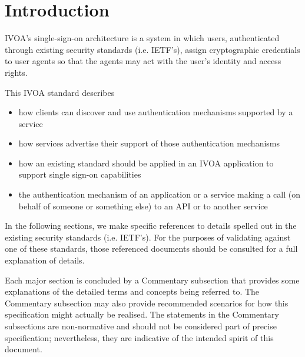 \documentclass[11pt,a4paper]{ivoa}
\begin{document}
\section{Introduction}

IVOA's single-sign-on architecture is a system in which users,
authenticated through existing security standards (i.e. IETF's), assign
cryptographic credentials to user agents so that the agents may act with
the user's identity and access rights.

This IVOA standard describes
         \begin{itemize}
              \item how clients can discover and use authentication
                    mechanisms supported by a service
             \item how services advertise their support of those
                    authentication mechanisms
	     \item how an existing standard should be applied in an IVOA
              application to support single sign-on capabilities
              \item the authentication mechanism of an application or
              a service making a call (on behalf of someone or something
              else) to an API or to another service
          \end{itemize}
In the following sections, we
make specific references to details spelled out in the
existing security standards (i.e. IETF's). For
the purposes of validating against one of these standards, those
referenced
documents should be consulted for a full explanation of details.

Each major section is concluded by a Commentary subsection that provides
some explanations of the detailed terms and concepts being referred to.
The Commentary subsection may also provide recommended scenarios for how
this specification might actually be realised. The statements
in the Commentary subsections are non-normative and should not be
considered part of precise specification; nevertheless, they are
indicative of the intended spirit of this document.
\end{document}
